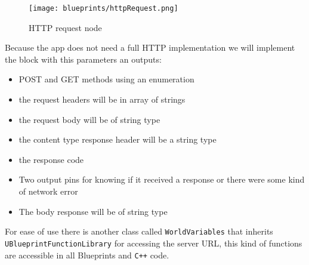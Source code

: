 \begin{figure}[h]
    \centering
    \texttt{[image: blueprints/httpRequest.png]}
    \caption{HTTP request node}
    \label{fig:HTTPrequest}
\end{figure}
\noindent
Because the app does not need a full \ac{HTTP} implementation we will implement the block with this parameters an outputs:
\begin{itemize}
    \item POST and GET methods using an enumeration
    \item the request headers will be in array of strings
    \item the request body will be of string type
    \item the content type response header will be a string type
    \item the response code
    \item Two output pins for knowing if it received a response or there were some kind of network error
    \item The body response will be of string type
\end{itemize}
\noindent
For ease of use there is another class called \texttt{WorldVariables} that inherits \linebreak\texttt{UBlueprintFunctionLibrary} for accessing the server \ac{URL}, this kind of functions are accessible in all Blueprints and \texttt{C++} code.
